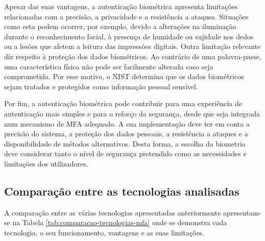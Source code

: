 \hspace{1cm} Apesar das suas vantagens, a autenticação biométrica apresenta limitações relacionadas com a precisão, a privacidade e a resistência a ataques. Situações como esta podem ocorrer, por exemplo, devido a alterações na iluminação durante o reconhecimento facial, à presença de humidade ou sujidade nos dedos ou a lesões que afetem a leitura das impressões digitais. Outra limitação relevante diz respeito à proteção dos dados biométricos. Ao contrário de uma palavra-passe, uma característica física não pode ser facilmente alterada caso seja comprometida. Por esse motivo, o NIST determina que os dados biométricos sejam tratados e protegidos como informação pessoal sensível.

\hspace{1cm} Por fim, a autenticação biométrica pode contribuir para uma experiência de autenticação mais simples e para o reforço da segurança, desde que seja integrada num mecanismo de MFA adequado. A sua implementação deve ter em conta a precisão do sistema, a proteção dos dados pessoais, a resistência a ataques e a disponibilidade de métodos alternativos. Desta forma, a escolha da biometria deve considerar tanto o nível de segurança pretendido como as necessidades e limitações dos utilizadores.

\subsection{Comparação entre as tecnologias analisadas}

\hspace{1cm} A comparação entre as várias tecnologias apresentadas anteriormente apresentam-se na Tabela \ref{tab:comparacao-tecnologias-mfa} onde se demonstra cada tecnologia, o seu funcionamento, vantagens e as suas limitações.

